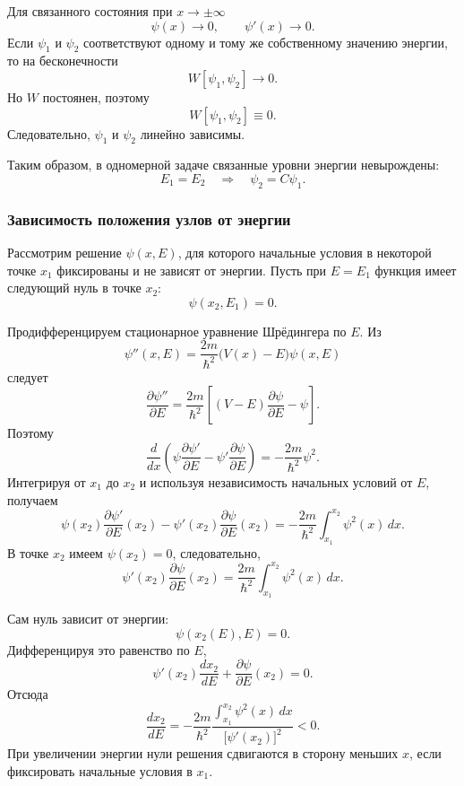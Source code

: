 \documentclass[12pt,a4paper]{article}
\begin{document}
Для связанного состояния при $x\to\pm\infty$
\[
    \psi(x)\to0,
    \qquad
    \psi'(x)\to0.
\]
Если $\psi_1$ и $\psi_2$ соответствуют одному и тому же собственному
значению энергии, то на бесконечности
\[
    W[\psi_1,\psi_2]\to0.
\]
Но $W$ постоянен, поэтому
\[
    W[\psi_1,\psi_2]\equiv0.
\]
Следовательно, $\psi_1$ и $\psi_2$ линейно зависимы.

Таким образом, в одномерной задаче связанные уровни энергии
невырождены:
\[
    \boxed{
        E_1=E_2
        \quad\Longrightarrow\quad
        \psi_2=C\psi_1
    }.
\]


\subsubsection{Зависимость положения узлов от энергии}

Рассмотрим решение $\psi(x,E)$, для которого начальные условия в
некоторой точке $x_1$ фиксированы и не зависят от энергии. Пусть при
$E=E_1$ функция имеет следующий нуль в точке $x_2$:
\[
    \psi(x_2,E_1)=0.
\]

Продифференцируем стационарное уравнение Шрёдингера по $E$. Из
\[
    \psi''(x,E)
    =
    \frac{2m}{\hbar^2}
    \bigl(V(x)-E\bigr)\psi(x,E)
\]
следует
\[
    \frac{\partial\psi''}{\partial E}
    =
    \frac{2m}{\hbar^2}
    \left[
        (V-E)\frac{\partial\psi}{\partial E}
        -
        \psi
    \right].
\]
Поэтому
\[
    \frac{d}{dx}
    \left(
        \psi\frac{\partial\psi'}{\partial E}
        -
        \psi'\frac{\partial\psi}{\partial E}
    \right)
    =
    -\frac{2m}{\hbar^2}\psi^2.
\]
Интегрируя от $x_1$ до $x_2$ и используя независимость начальных
условий от $E$, получаем
\[
    \psi(x_2)\frac{\partial\psi'}{\partial E}(x_2)
    -
    \psi'(x_2)\frac{\partial\psi}{\partial E}(x_2)
    =
    -\frac{2m}{\hbar^2}
    \int_{x_1}^{x_2}\psi^2(x)\,dx.
\]
В точке $x_2$ имеем $\psi(x_2)=0$, следовательно,
\[
    \psi'(x_2)
    \frac{\partial\psi}{\partial E}(x_2)
    =
    \frac{2m}{\hbar^2}
    \int_{x_1}^{x_2}\psi^2(x)\,dx.
\]

Сам нуль зависит от энергии:
\[
    \psi(x_2(E),E)=0.
\]
Дифференцируя это равенство по $E$,
\[
    \psi'(x_2)
    \frac{dx_2}{dE}
    +
    \frac{\partial\psi}{\partial E}(x_2)
    =
    0.
\]
Отсюда
\[
    \boxed{
    \frac{dx_2}{dE}
    =
    -\frac{2m}{\hbar^2}
    \frac{
        \displaystyle
        \int_{x_1}^{x_2}\psi^2(x)\,dx
    }{
        \bigl[\psi'(x_2)\bigr]^2
    }
    <0
    }.
\]
При увеличении энергии нули решения сдвигаются в сторону меньших
$x$, если фиксировать начальные условия в $x_1$.
\end{document}
